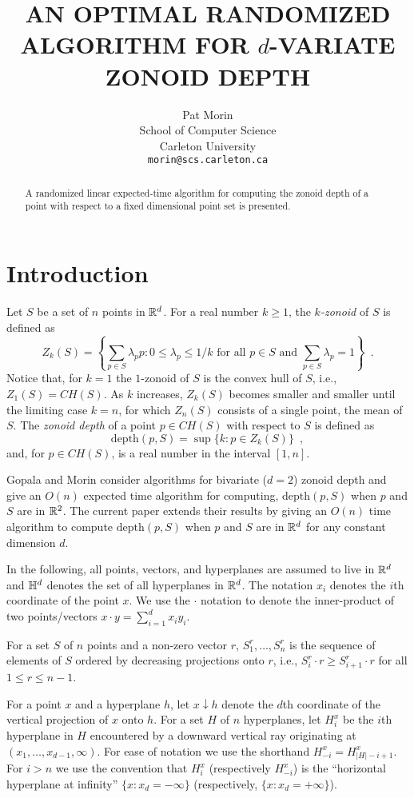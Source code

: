 \documentclass[lotsofwhite]{patmorin}
\title{\MakeUppercase{An Optimal Randomized Algorithm
	for} $d$\MakeUppercase{-Variate Zonoid Depth}}
\author{Pat Morin \\ 
	School of Computer Science \\
	Carleton University \\
	\texttt{morin@scs.carleton.ca}}
\date{}
\newcommand{\CH}{\mathit{CH}}
\newcommand{\depth}{\mathrm{depth}}
\newcommand{\drop}{\!\!\downarrow\!\!}
\begin{document}
\maketitle
\begin{abstract}
A randomized linear expected-time algorithm for computing the 
zonoid depth of a point with respect to a fixed dimensional point set is
presented.
\end{abstract}

\section{Introduction}

Let $S$ be a set of $n$ points in $\mathbb{R}^d$.
For a real number $k\ge 1$, the \emph{$k$-zonoid} of $S$ is defined as 
\[
      Z_k(S) = \left\{\sum_{p\in S}\lambda_p p
	: \mbox{$0\le \lambda_p \le 1/k$ for all $p\in S$  
	   and $\sum_{p\in S}\lambda_p = 1$}  \right\} \enspace .
\] 
Notice that, for $k=1$ the $1$-zonoid of $S$ is the convex hull of
$S$,  i.e., $Z_1(S)=\CH(S)$.
As $k$ increases, $Z_k(S)$ becomes smaller and smaller until
the limiting case $k=n$, for which $Z_n(S)$ consists of a single point,
the mean of $S$.  The \emph{zonoid depth} of a point
$p\in\CH(S)$ with respect to $S$ is defined as
\[
     \depth(p,S) = \sup\{k : p\in Z_k(S) \} \enspace ,
\]
and, for $p\in\CH(S)$, is a real number in the interval $[1,n]$.

Gopala and Morin \cite{gm06} consider algorithms for bivariate ($d=2$)
zonoid depth and give an $O(n)$ expected time algorithm for computing,
$\depth(p,S)$ when $p$ and $S$ are in $\mathbb{R}^2$.  The current
paper extends their results by giving an $O(n)$ time algorithm to compute
$\depth(p,S)$ when $p$ and $S$ are in $\mathbb{R}^d$ for any constant
dimension $d$. 

In the following, all points, vectors, and hyperplanes are assumed to
live in $\mathbb{R}^d$ and $\mathbb{H}^d$ denotes the set of all hyperplanes in
$\mathbb{R}^d$.  The notation $x_i$ denotes the $i$th coordinate of the point
$x$.  We use the $\cdot$ notation to denote the inner-product of two
points/vectors $x\cdot y=\sum_{i=1}^d x_iy_i$.

For a set $S$ of $n$ points and a non-zero vector $r$,
$S_1^r,\ldots,S_n^r$ is the sequence of elements of $S$ ordered by
decreasing projections onto $r$, i.e., $S_i^r\cdot r \ge
S_{i+1}^r\cdot r$ for all $1\le r\le n-1$.

For a point $x$
and a hyperplane $h$, let $x\drop h$ denote the $d$th coordinate of
the vertical projection of $x$ onto $h$.  For a set $H$ of $n$
hyperplanes, let $H_i^x$ be the $i$th hyperplane in $H$ encountered by
a downward vertical ray originating at $(x_1,\ldots,x_{d-1},\infty)$.
For ease of notation we use the shorthand $H_{-i}^x=H_{|H|-i+1}^x$.
For $i>n$ we use the convention that $H_{i}^x$
(respectively $H_{-i}^x$) is the ``horizontal hyperplane at infinity''
$\{x:x_d=-\infty\}$ (respectively,
$\{x:x_d=+\infty\}$). 
\end{document}
